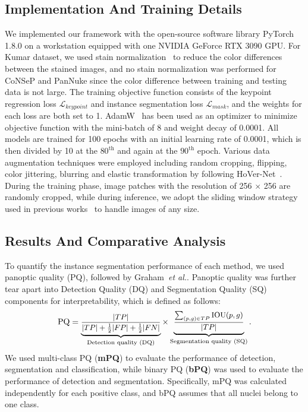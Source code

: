 \documentclass[lettersize,journal]{IEEEtran}
\newcommand{\etal}{{\textit{et al.}}}
\begin{document}
\subsection{Implementation And Training Details}
We implemented our framework with the open-source software library PyTorch 1.8.0 on a workstation equipped with one NVIDIA GeForce RTX 3090 GPU. For Kumar dataset, we used stain normalization~\cite{stainnorm} to reduce the color differences between the stained images, and no stain normalization was performed for CoNSeP and PanNuke since the color difference between training and testing data is not large. The training objective function consists of the keypoint regression loss $\mathcal{L}_{keypoint}$ and instance segmentation loss $\mathcal{L}_{mask}$, and the weights for each loss are both set to 1. AdamW~\cite{adamw} has been used as an optimizer to minimize objective function with the mini-batch of 8 and weight decay of 0.0001. All models are trained for 100 epochs with an initial learning rate of 0.0001, which is then divided by 10 at the $80^{\text{th}}$ and again at the $90^{\text{th}}$ epoch. Various data augmentation techniques were employed including random cropping, flipping, color jittering, blurring and elastic transformation by following HoVer-Net~\cite{hovernet}. During the training phase, image patches with the resolution of 256 $\times$ 256 are randomly cropped, while during inference, we adopt the sliding window strategy used in previous works~\cite{dist,cianet,hovernet} to handle images of any size.

\subsection{Results And Comparative Analysis}
To quantify the instance segmentation performance of each method, we used panoptic quality (PQ), followed by Graham~\etal\cite{hovernet}. Panoptic quality was further tear apart into Detection Quality (DQ) and Segmentation Quality (SQ) components for interpretability, which is defined as follows:
\begin{equation*}
\small
{\rm PQ}= \underbrace{\frac{|TP|}{ |TP|+\frac{1}{2}|FP| + \frac{1}{2}|FN|}}_{\text{Detection quality (DQ)}} \times \underbrace{\frac{\sum_{(p,g)\in TP} {\rm IOU}(p,g)}{ |TP|}}_{\text{Segmentation quality (SQ)}}.
\end{equation*}
We used multi-class PQ (\textbf{mPQ}) to evaluate the performance of detection, segmentation and classification, while binary PQ (\textbf{bPQ}) was used to evaluate the performance of detection and segmentation. Specifically, mPQ was calculated independently for each positive class, and bPQ assumes that all nuclei belong to one class.
\end{document}
